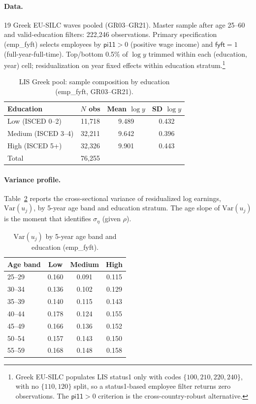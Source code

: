 \paragraph{Data.} 19 Greek EU-SILC waves pooled (GR03--GR21). Master sample after age 25--60 and valid-education filters: 222{,}246 observations. Primary specification (\textsf{emp\_fyft}) selects employees by $\textsf{pi11} > 0$ (positive wage income) and $\textsf{fyft} = 1$ (full-year-full-time). Top/bottom 0.5\% of $\log y$ trimmed within each (education, year) cell; residualization on year fixed effects within education stratum.\footnote{Greek EU-SILC populates LIS \textsf{status1} only with codes $\{100, 210, 220, 240\}$, with no $\{110, 120\}$ split, so a \textsf{status1}-based employee filter returns zero observations. The $\textsf{pi11} > 0$ criterion is the cross-country-robust alternative.}

\begin{table}[H]
\centering
\small
\caption{LIS Greek pool: sample composition by education (\textsf{emp\_fyft}, GR03--GR21).}
\label{tab:lis-sample}
\begin{tabular}{lccc}
\toprule
Education & $N$ obs & Mean $\log y$ & SD $\log y$ \\
\midrule
Low (ISCED 0--2)    & 11{,}718 & 9.489 & 0.432 \\
Medium (ISCED 3--4) & 32{,}211 & 9.642 & 0.396 \\
High (ISCED 5+)     & 32{,}326 & 9.901 & 0.443 \\
\midrule
Total              & 76{,}255 &       &       \\
\bottomrule
\end{tabular}
\end{table}

\paragraph{Variance profile.} Table~\ref{tab:lis-variance-profile} reports the cross-sectional variance of residualized log earnings, $\mathrm{Var}(u_j)$, by 5-year age band and education stratum. The age slope of $\mathrm{Var}(u_j)$ is the moment that identifies $\sigma_\eta$ (given $\rho$).

\begin{table}[H]
\centering
\small
\caption{$\mathrm{Var}(u_j)$ by 5-year age band and education (\textsf{emp\_fyft}).}
\label{tab:lis-variance-profile}
\begin{tabular}{lccc}
\toprule
Age band & Low & Medium & High \\
\midrule
25--29 & 0.160 & 0.091 & 0.115 \\
30--34 & 0.136 & 0.102 & 0.129 \\
35--39 & 0.140 & 0.115 & 0.143 \\
40--44 & 0.178 & 0.124 & 0.155 \\
45--49 & 0.166 & 0.136 & 0.152 \\
50--54 & 0.157 & 0.143 & 0.150 \\
55--59 & 0.168 & 0.148 & 0.158 \\
\bottomrule
\end{tabular}
\end{table}

